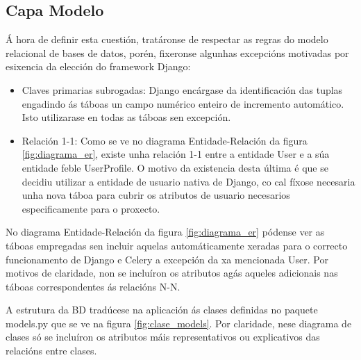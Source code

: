 \subsection{Capa Modelo}

Á hora de definir esta cuestión, tratáronse de respectar as regras do modelo relacional de bases de datos, porén, fixeronse algunhas excepcións motivadas por esixencia da elección do framework Django:

\begin{itemize}
	\item Claves primarias subrogadas: Django encárgase da identificación das tuplas engadindo ás táboas un campo numérico enteiro de incremento automático. Isto utilizarase en todas as táboas sen excepción.
	
	\item Relación 1-1: Como se ve no diagrama Entidade-Relación da figura \ref{fig:diagrama_er}, existe unha relación 1-1 entre a entidade User e a súa entidade feble UserProfile. O motivo da existencia desta última é que se decidiu utilizar a entidade de usuario nativa de Django, co cal fíxose necesaria unha nova táboa para cubrir os atributos de usuario necesarios especificamente para o proxecto. 
\end{itemize}

No diagrama Entidade-Relación da figura \ref{fig:diagrama_er} pódense ver as táboas empregadas sen incluir aquelas automáticamente xeradas para o correcto funcionamento de Django e Celery a excepción da xa mencionada User. Por motivos de claridade, non se incluíron os atributos agás aqueles adicionais nas táboas correspondentes ás relacións N-N.

A estrutura da BD tradúcese na aplicación ás clases definidas no paquete models.py que se ve na figura \ref{fig:clase_models}. Por claridade, nese diagrama de clases só se incluíron os atributos máis representativos ou explicativos das relacións entre clases.

